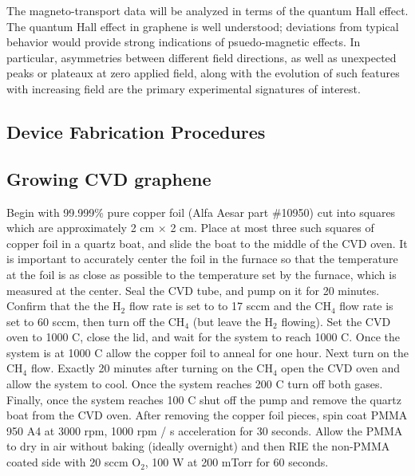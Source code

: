 \documentclass[edeposit,fullpage,draftthesis]{uiucthesis2009}
\begin{document}
            The magneto-transport data will be analyzed in terms of the quantum Hall effect. The quantum
            Hall effect in graphene is well understood; deviations from typical behavior would provide
            strong indications of psuedo-magnetic effects. In particular, asymmetries between different
            field directions, as well as unexpected peaks or plateaux at zero applied field, along with
            the evolution of such features with increasing field are the primary experimental signatures
            of interest.
            
   
 
\begin{appendices}

\chapter{Device Fabrication Procedures}
\label{appendix:fab}

\section{Growing CVD graphene}

    Begin with 99.999\% pure copper foil (Alfa Aesar part \#10950) cut into squares which are
    approximately 2 cm $\times$ 2 cm. Place at most three such squares of copper foil
    in a quartz boat, and slide the boat to the middle of the CVD oven. It is important
    to accurately center the foil in the furnace so that the temperature at the foil is as
    close as possible to the temperature set by the furnace, which is measured at the center.
    Seal the CVD tube, and pump on it for 20 minutes. Confirm that the the H$_2$ flow rate 
    is set to to 17 sccm and the CH$_4$ flow rate is set to 60 sccm, then turn off the CH$_4$
    (but leave the H$_2$ flowing). Set the CVD oven to 1000 C, close the lid, and wait for the
    system to reach 1000 C. Once the system is at 1000 C allow the copper foil to anneal for
    one hour. Next turn on the CH$_4$ flow. Exactly 20 minutes after turning on the CH$_4$
    open the CVD oven and allow the system to cool. Once the system reaches 200 C turn off
    both gases. Finally, once the system reaches 100 C shut off the pump and remove the 
    quartz boat from the CVD oven. After removing the copper foil pieces, spin coat PMMA 950 A4
    at 3000 rpm, 1000 rpm / s acceleration for 30 seconds. Allow the PMMA to dry in air without
    baking (ideally overnight) and then RIE the non-PMMA coated side with 20 sccm O$_2$, 100 W 
    at 200 mTorr for 60 seconds.
    

\end{appendices}
\end{document}
